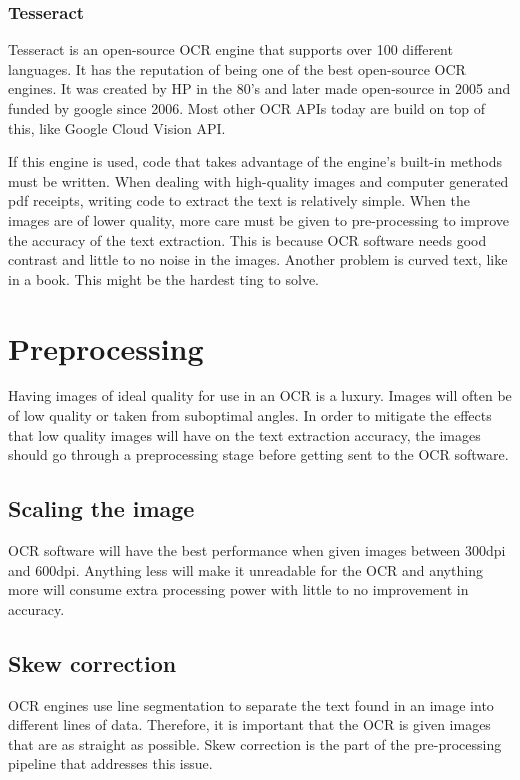\subsubsection{Tesseract}\label{subsubsec:Tesseract}
Tesseract is an open-source OCR engine that supports over 100 different languages.
It has the reputation of being one of the best open-source OCR engines.
It was created by HP in the 80's and later made open-source in 2005 and funded by google since 2006.
Most other OCR APIs today are build on top of this, like Google Cloud Vision API.

If this engine is used, code that takes advantage of the engine's built-in methods must be written.
When dealing with high-quality images and computer generated pdf receipts, writing code to extract the text is relatively simple.
When the images are of lower quality, more care must be given to pre-processing to improve the accuracy of the text
extraction.
This is because OCR software needs good contrast and little to no noise in the images.
Another problem is curved text, like in a book.
This might be the hardest ting to solve.

\section{Preprocessing}\label{sec:preprocessing}
Having images of ideal quality for use in an OCR is a luxury.
Images will often be of low quality or taken from suboptimal angles.
In order to mitigate the effects that low quality images will have on the text extraction accuracy, the images should go through a preprocessing stage before getting sent to the OCR software.

\subsection{Scaling the image}\label{subsec:scaling-the-image}
OCR software will have the best performance when given images between 300dpi and 600dpi.
Anything less will make it unreadable for the OCR and anything more will consume extra processing power with little to no improvement in accuracy.

\subsection{Skew correction}\label{subsec:skew-correction}
OCR engines use line segmentation to separate the text found in an image into different lines of data.
Therefore, it is important that the OCR is given images that are as straight as possible.
Skew correction is the part of the pre-processing pipeline that addresses this issue.

